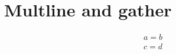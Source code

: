 \section{Multline and gather}

\begin{gather}
a = b \label{eq:g1} \\
c = d \label{eq:g2}
\end{gather}
